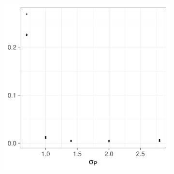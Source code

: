 \begin{figure}[htbp]
\begin{subfigure}[t]{0.49\textwidth}
        \includegraphics[width=\textwidth]{results/by_population_spread/RMISE-vs-population-spread}
        \caption{}
        \label{fig:ise:pop_spread:rmise}
    \end{subfigure}


\end{figure}
